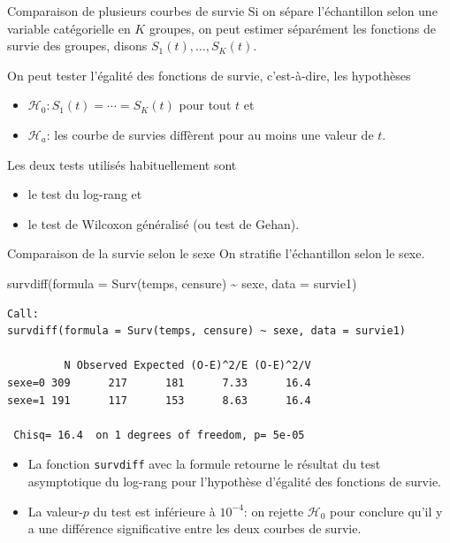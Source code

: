 \documentclass[
  ignorenonframetext,
]{beamer}
\newenvironment{Shaded}{\begin{snugshade}}{\end{snugshade}}
\newcommand{\AttributeTok}[1]{\textcolor[rgb]{0.40,0.45,0.13}{#1}}
\newcommand{\FunctionTok}[1]{\textcolor[rgb]{0.28,0.35,0.67}{#1}}
\newcommand{\NormalTok}[1]{\textcolor[rgb]{0.00,0.23,0.31}{#1}}
\newcommand{\SpecialCharTok}[1]{\textcolor[rgb]{0.37,0.37,0.37}{#1}}
\providecommand{\tightlist}{%
  \setlength{\itemsep}{0pt}\setlength{\parskip}{0pt}}\usepackage{longtable,booktabs,array}
\begin{document}
\begin{frame}{Comparaison de plusieurs courbes de survie}
\protect\hypertarget{comparaison-de-plusieurs-courbes-de-survie}{}
Si on sépare l'échantillon selon une variable catégorielle en \(K\)
groupes, on peut estimer séparément les fonctions de survie des groupes,
disons \(S_1(t), \ldots, S_K(t)\).

On peut tester l'égalité des fonctions de survie, c'est-à-dire, les
hypothèses

\begin{itemize}
\tightlist
\item
  \(\mathscr{H}_0: S_1(t) = \cdots = S_K(t)\) pour tout \(t\) et
\item
  \(\mathscr{H}_a\): les courbe de survies diffèrent pour au moins une
  valeur de \(t\).
\end{itemize}

Les deux tests utilisés habituellement sont

\begin{itemize}
\tightlist
\item
  le test du log-rang et
\item
  le test de Wilcoxon généralisé (ou test de Gehan).
\end{itemize}
\end{frame}

\begin{frame}[fragile]{Comparaison de la survie selon le sexe}
\protect\hypertarget{comparaison-de-la-survie-selon-le-sexe}{}
On stratifie l'échantillon selon le sexe.

\begin{Shaded}
\begin{Highlighting}[numbers=left,,]
\FunctionTok{survdiff}\NormalTok{(}\AttributeTok{formula =} \FunctionTok{Surv}\NormalTok{(temps, censure) }\SpecialCharTok{\textasciitilde{}}\NormalTok{ sexe, }
         \AttributeTok{data =}\NormalTok{ survie1)}
\end{Highlighting}
\end{Shaded}

\begin{verbatim}
Call:
survdiff(formula = Surv(temps, censure) ~ sexe, data = survie1)

         N Observed Expected (O-E)^2/E (O-E)^2/V
sexe=0 309      217      181      7.33      16.4
sexe=1 191      117      153      8.63      16.4

 Chisq= 16.4  on 1 degrees of freedom, p= 5e-05 
\end{verbatim}

\footnotesize

\begin{itemize}
\tightlist
\item
  La fonction \texttt{survdiff} avec la formule retourne le résultat du
  test asymptotique du log-rang pour l'hypothèse d'égalité des fonctions
  de survie.
\item
  La valeur-\(p\) du test est inférieure à \(10^{-4}\): on rejette
  \(\mathscr{H}_0\) pour conclure qu'il y a une différence significative
  entre les deux courbes de survie.
\end{itemize}
\end{frame}
\end{document}
